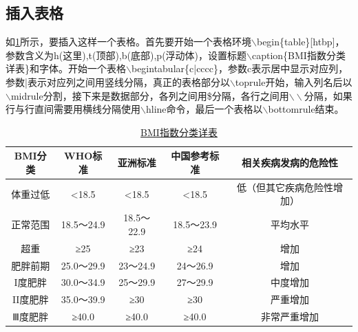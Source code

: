 \subsection{插入表格}
如\ref{tab:table1}所示，要插入这样一个表格。首先要开始一个表格环境$\backslash$begin\{table\}[htbp]，参数含义为h(这里),t(顶部),b(底部),p(浮动体)，设置标题$\backslash$caption\{BMI指数分类详表\}和字体。开始一个表格$\backslash$begin{tabular}\{c|cccc\}，参数c表示居中显示对应列，参数|表示对应列之间用竖线分隔，真正的表格部分以$\backslash$toprule开始，输入列名后以$\backslash$midrule分割，接下来是数据部分，各列之间用\$分隔，各行之间用$\backslash\backslash$分隔，如果行与行直间需要用横线分隔使用$\backslash$hline命令，最后一个表格以$\backslash$bottomrule结束。
\begin{table}[htbp]
\caption{\textcolor[rgb]{1.00,0.00,0.00}{\href{http://baike.baidu.com/link?url=YDwxEa1gfVTHNICd8OjZG-YLsBgE4iFsy0UkQ-d4jVyln9tqov_jmFNlVwRD_sAB}{BMI指数分类详表}}}\label{tab:table1}
\vspace{0.5em}\centering\wuhao
\begin{tabular}{c|cccc}
\toprule[1.5pt]
BMI分类 & WHO标准 & 亚洲标准 & 中国参考标准 & 相关疾病发病的危险性\\
\midrule[1pt]
体重过低&<18.5&<18.5&<18.5&低（但其它疾病危险性增加）\\
\cline{3-4}
正常范围&18.5～24.9&18.5～22.9&18.5～23.9&平均水平\\
超重&≥25&≥23&≥24&增加\\
肥胖前期&25.0～29.9&23～24.9&24～26.9&增加\\
I度肥胖&30.0～34.9&25～29.9&27～29.9&中度增加\\
II度肥胖&35.0～39.9&≥30&≥30&严重增加\\
Ⅲ度肥胖&≥40.0&≥40.0&≥40.0&非常严重增加\\
\bottomrule[1.5pt]
\end{tabular}
\vspace{\baselineskip}
\end{table}
\FloatBarrier
